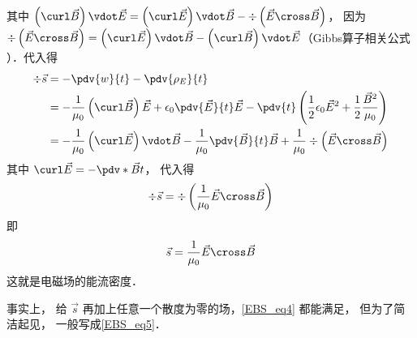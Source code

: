 其中 $\left( {\curl \vec B} \right) \vdot \vec E = \left( {\curl \vec E} \right) \vdot \vec B - \div \left( {\vec E \cross \vec B} \right)$， 因为 $\div \left( {\vec E \cross \vec B} \right) = \left( {\curl \vec E} \right) \vdot \vec B - \left( {\curl \vec B} \right) \vdot \vec E$（Gibbs算子相关公式%
）．代入得
\begin{equation}
\begin{aligned}
\div \vec s &=  - \pdv{w}{t} - \pdv{\rho _E}{t}\\
&=  - \frac{1}{{{\mu _0}}}\left( {\curl \vec B} \right)\vec E + {\epsilon _0}\pdv{\vec E}{t} \vec E - \pdv{t} \left( {\frac{1}{2}{\epsilon _0}{{\vec E}^2} + \frac{1}{2}\frac{{{{\vec B}^2}}}{{{\mu _0}}}} \right)\\
&=  - \frac{1}{{{\mu _0}}}\left( {\curl \vec E} \right) \vdot \vec B - \frac{1}{{{\mu _0}}}\pdv{\vec B}{t} \vec B + \frac{1}{{{\mu _0}}}\div \left( {\vec E \cross \vec B} \right)
\end{aligned}
\end{equation} 
其中 $\curl \vec E =  -\pdv*{\vec B}{t}$， 代入得
\begin{equation}\label{EBS_eq4}
\div \vec s = \div \left( {\frac{1}{{{\mu _0}}}\vec E \cross \vec B} \right)
\end{equation} 
即
\begin{equation}\label{EBS_eq5}
\vec s = \frac{1}{{{\mu _0}}}\vec E \cross \vec B
\end{equation} 
这就是电磁场的能流密度．

事实上， 给 $\vec s$ 再加上任意一个散度为零的场，\autoref{EBS_eq4} 都能满足， 但为了简洁起见， 一般写成\autoref{EBS_eq5}． 





